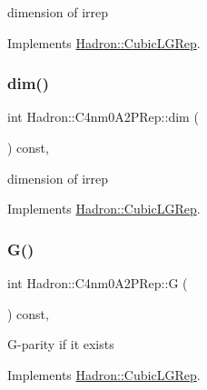 dimension of irrep 

Implements \mbox{\hyperlink{structHadron_1_1CubicLGRep_a3acbaea26503ed64f20df693a48e4cdd}{Hadron\+::\+Cubic\+L\+G\+Rep}}.

\mbox{\label{structHadron_1_1C4nm0A2PRep_a5a7d243b4be2939bb39515b7563a804d}} 
\subsubsection{\texorpdfstring{dim()}{dim()}\hspace{0.1cm}{\footnotesize\ttfamily [2/2]}}
{\footnotesize\ttfamily int Hadron\+::\+C4nm0\+A2\+P\+Rep\+::dim (\begin{DoxyParamCaption}{ }\end{DoxyParamCaption}) const\hspace{0.3cm}{\ttfamily [inline]}, {\ttfamily [virtual]}}

dimension of irrep 

Implements \mbox{\hyperlink{structHadron_1_1CubicLGRep_a3acbaea26503ed64f20df693a48e4cdd}{Hadron\+::\+Cubic\+L\+G\+Rep}}.

\mbox{\label{structHadron_1_1C4nm0A2PRep_a8340077e9f3fea9b7b6421d3e9068d47}} 
\subsubsection{\texorpdfstring{G()}{G()}\hspace{0.1cm}{\footnotesize\ttfamily [1/2]}}
{\footnotesize\ttfamily int Hadron\+::\+C4nm0\+A2\+P\+Rep\+::G (\begin{DoxyParamCaption}{ }\end{DoxyParamCaption}) const\hspace{0.3cm}{\ttfamily [inline]}, {\ttfamily [virtual]}}

G-\/parity if it exists 

Implements \mbox{\hyperlink{structHadron_1_1CubicLGRep_ace26f7b2d55e3a668a14cb9026da5231}{Hadron\+::\+Cubic\+L\+G\+Rep}}.

\mbox{\label{structHadron_1_1C4nm0A2PRep_a8340077e9f3fea9b7b6421d3e9068d47}} 
